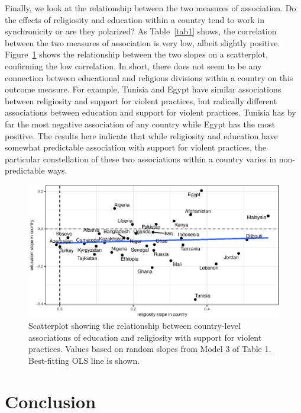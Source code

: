 \documentclass[10pt,letterpaper]{article}
\begin{document}
Finally, we look at the relationship between the two measures of
association. Do the effects of religiosity and education within a
country tend to work in synchronicity or are they polarized? As Table~\ref{tab1}
shows, the correlation between the two measures of association is very
low, albeit slightly positive. Figure~\ref{fig5} shows the relationship between
the two slopes on a scatterplot, confirming the low correlation. In
short, there does not seem to be any connection between educational and
religious divisions within a country on this outcome measure. For
example, Tunisia and Egypt have similar associations between religiosity
and support for violent practices, but radically different associations
between education and support for violent practices. Tunisia has by far
the most negative association of any country while Egypt has the most
positive. The results here indicate that while religiosity and education
have somewhat predictable association with support for violent
practices, the particular constellation of these two associations within
a country varies in non-predictable ways.

\begin{figure}[!h]
\begin{adjustwidth}{-2.25in}{0in}
\centering
\includegraphics{figures/fig5.eps}
\caption{Scatterplot showing the relationship between country-level
associations of education and religiosity with support for violent
practices. Values based on random slopes from Model 3 of Table 1.
Best-fitting OLS line is shown.}
\label{fig5}
\end{adjustwidth}
\end{figure}

\section*{Conclusion}
\end{document}
